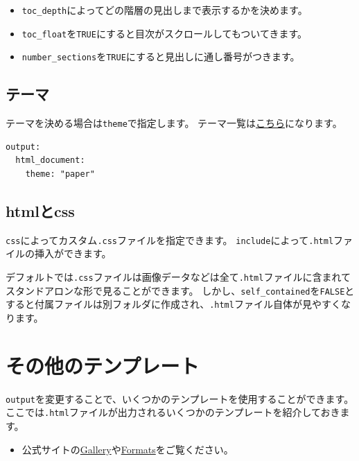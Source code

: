 \documentclass[]{bxjsreport}
\providecommand{\tightlist}{%
  \setlength{\itemsep}{0pt}\setlength{\parskip}{0pt}}
\let\asdf\section
\renewcommand{\section}{\chapter}
\let\asdff\subsection
\renewcommand{\subsection}{\asdf}
\renewcommand{\subsubsection}{\asdff}
\begin{document}
\begin{itemize}
\tightlist
\item
  \texttt{toc\_depth}によってどの階層の見出しまで表示するかを決めます。
\item
  \texttt{toc\_float}を\texttt{TRUE}にすると目次がスクロールしてもついてきます。
\item
  \texttt{number\_sections}を\texttt{TRUE}にすると見出しに通し番号がつきます。
\end{itemize}

\hypertarget{ux30c6ux30fcux30de}{%
\subsubsection{テーマ}\label{ux30c6ux30fcux30de}}

テーマを決める場合は\texttt{theme}で指定します。
テーマ一覧は\href{https://bootswatch.com/3/}{こちら}になります。

\begin{verbatim}
output:
  html_document:
    theme: "paper"
\end{verbatim}

\hypertarget{htmlux3068css}{%
\subsubsection{htmlとcss}\label{htmlux3068css}}

\texttt{css}によってカスタム\texttt{.css}ファイルを指定できます。
\texttt{include}によって\texttt{.html}ファイルの挿入ができます。

デフォルトでは\texttt{.css}ファイルは画像データなどは全て\texttt{.html}ファイルに含まれてスタンドアロンな形で見ることができます。
しかし、\texttt{self\_contained}を\texttt{FALSE}とすると付属ファイルは別フォルダに作成され、\texttt{.html}ファイル自体が見やすくなります。

\hypertarget{Others}{%
\subsection{その他のテンプレート}\label{Others}}

\texttt{output}を変更することで、いくつかのテンプレートを使用することができます。
ここでは\texttt{.html}ファイルが出力されるいくつかのテンプレートを紹介しておきます。

\begin{itemize}
\tightlist
\item
  公式サイトの\href{https://rmarkdown.rstudio.com/gallery.html}{Gallery}や\href{https://rmarkdown.rstudio.com/formats.html}{Formats}をご覧ください。
\end{itemize}
\end{document}

